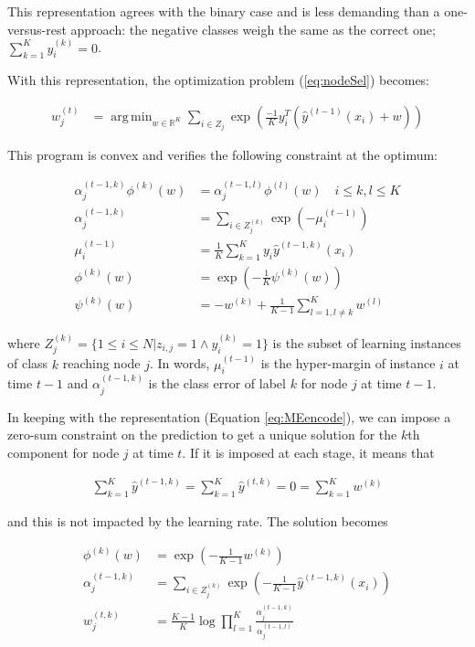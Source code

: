 \documentclass{article}
\DeclareMathOperator*{\argmin}{arg\,min}
\begin{document}
This representation agrees with the binary case and is less demanding than a 
one-versus-rest approach: the negative classes weigh the same as the correct 
one; $\sum_{k=1}^{K} y_i^{(k)} = 0$.

With this representation, the optimization problem (\ref{eq:nodeSel}) becomes:

\begin{align}\label{eq:MEmin}
w_j^{(t)} &=  \argmin_{w \in \mathbb{R}^K} \sum_{i \in Z_j} \exp 
\left(\frac{-1}{K} y_i^T \left(\hat{y}^{(t-1)}(x_i) + w \right)\right)
\end{align}

This program is convex and verifies the following constraint at the optimum:

\begin{align}\label{eq:MEequation}
\alpha_j^{(t-1, k)}\phi^{(k)}(w) &= \alpha_j^{(t-1, l)}\phi^{(l)}(w) \quad i 
\leq k,l \leq K \\
\alpha_j^{(t-1, k)} &= \sum_{i \in Z_j^{(k)}} \exp \left( - \mu_i^{(t-1)} 
\right) \\
\mu_i^{(t-1)} &= \frac{1}{K} \sum_{k=1}^{K} y_i \hat{y}^{(t-1, k)}(x_i) \\
\phi^{(k)}(w) &= \exp \left( - \frac{1}{K} \psi^{(k)}(w) \right) \\
\psi^{(k)}(w) &= -w^{(k)} + \frac{1}{K-1} \sum_{l=1, l\neq k}^{K}  w^{(l)}
\end{align}

where $Z_j^{(k)} = \{1 \leq i \leq N | z_{i,j} = 1 \wedge y_i^{(k)} = 1 \}$ is 
the subset of learning instances of class $k$ reaching node $j$. In words, 
$\mu_i^{(t-1)}$ is the hyper-margin of instance $i$ at time $t-1$ and 
$\alpha_j^{(t-1, k)}$ is the class error of label $k$ for node $j$ at time 
$t-1$.


In keeping with the representation (Equation \ref{eq:MEencode}), we can impose 
a zero-sum constraint on the prediction to get a unique solution for the $k$th 
component for node $j$ at time $t$. If it is imposed at each stage, it means 
that

\begin{align}\label{eq:MEzeroSum}
\sum_{k=1}^{K} \hat{y}^{(t-1, k)} = \sum_{k=1}^{K} 
\hat{y}^{(t, k)} = 0 = \sum_{k=1}^{K} w^{(k)}
\end{align}

and this is not impacted by the learning rate. The solution becomes

\begin{align}
\phi^{(k)}(w) &= \exp \left(-\frac{1}{K-1} w^{(k)}\right)\\ 
\label{eq:MEClsErrZS}
\alpha_j^{(t-1, k)} &= \sum_{i \in Z_j^{(k)}} \exp \left( -\frac{1}{K-1} 
\hat{y}^{(t-1, k)}(x_i) \right) \\ \label{eq:MEsolution}
w_j^{(t,k)} &= \frac{K-1}{K} \log \prod_{l=1}^{K} \frac{\alpha_j^{(t-1, 
k)}}{\alpha_j^{(t-1, l)}} 
\end{align}
\end{document}
